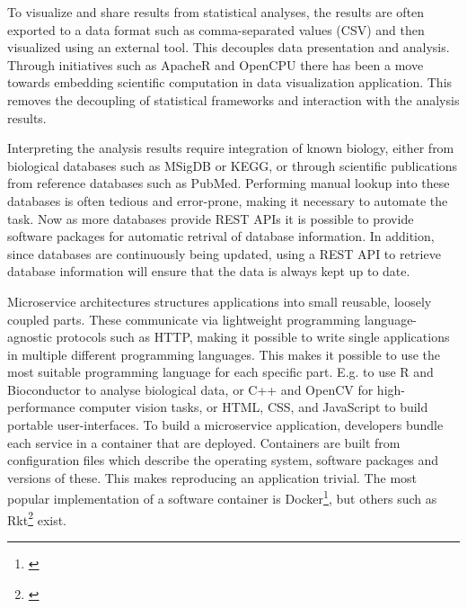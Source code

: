
To visualize and share results from statistical analyses, the results are often
exported to a data format such as comma-separated values (CSV) and
then visualized using an external tool. This decouples data presentation and
analysis.  
Through initiatives such as ApacheR and OpenCPU there has been a move
towards embedding scientific computation in data visualization application. This
removes the decoupling of statistical frameworks and interaction with the
analysis results. 

Interpreting the analysis results require integration of known biology, either
from biological databases such as MSigDB\cite{} or KEGG\cite{}, or through
scientific publications from reference databases such as PubMed\cite{}.
Performing manual lookup into these databases is often tedious and error-prone,
making it necessary to automate the task. Now as more databases provide REST
APIs it is possible to provide software packages for automatic retrival of
database information. In addition, since databases are continuously being
updated, using a REST API to retrieve database information will ensure that the
data is always kept up to date. 



Microservice architectures structures applications into small reusable, loosely
coupled parts. These communicate via lightweight programming language-agnostic
protocols such as HTTP, making it possible to write single applications in
multiple different programming languages. This makes it possible to use the most
suitable programming language for each specific part. E.g. to use R and
Bioconductor to analyse biological data, or C++ and OpenCV for high-performance
computer vision tasks, or HTML, CSS, and JavaScript to build portable
user-interfaces. To build a microservice application, developers bundle each
service in a container that are deployed. Containers are built from
configuration files which describe the operating system, software packages and
versions of these. This makes reproducing an application trivial. The most
popular implementation of a software container is Docker\footnote{\url{}}, but
others such as Rkt\footnote{\url{}} exist. 


